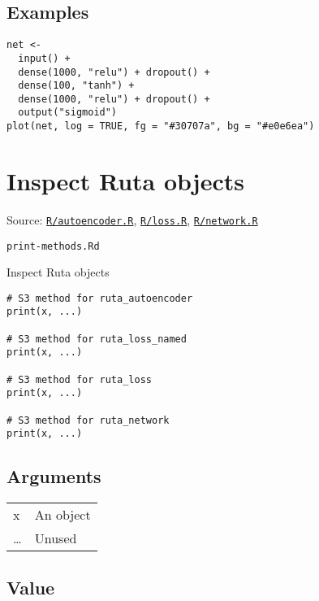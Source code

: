 \hypertarget{examples}{\subsection{\texorpdfstring{\protect\hyperlink{examples}{}Examples}{Examples}}\label{examples}}

\begin{verbatim}
net <-
  input() +
  dense(1000, "relu") + dropout() +
  dense(100, "tanh") +
  dense(1000, "relu") + dropout() +
  output("sigmoid")
plot(net, log = TRUE, fg = "#30707a", bg = "#e0e6ea")
\end{verbatim}

\section{Inspect Ruta objects}\label{inspect-ruta-objects}

Source:
\href{https://github.com/fdavidcl/ruta/blob/master/R/autoencoder.R}{\texttt{R/autoencoder.R}},
\href{https://github.com/fdavidcl/ruta/blob/master/R/loss.R}{\texttt{R/loss.R}},
\href{https://github.com/fdavidcl/ruta/blob/master/R/network.R}{\texttt{R/network.R}}

\texttt{print-methods.Rd}

Inspect Ruta objects

\begin{verbatim}
# S3 method for ruta_autoencoder
print(x, ...)

# S3 method for ruta_loss_named
print(x, ...)

# S3 method for ruta_loss
print(x, ...)

# S3 method for ruta_network
print(x, ...)
\end{verbatim}

\hypertarget{arguments}{\subsection{\texorpdfstring{\protect\hyperlink{arguments}{}Arguments}{Arguments}}\label{arguments}}

\begin{longtable}[c]{@{}ll@{}}
\toprule
x & An object\tabularnewline
\ldots{} & Unused\tabularnewline
\bottomrule
\end{longtable}

\hypertarget{value}{\subsection{\texorpdfstring{\protect\hyperlink{value}{}Value}{Value}}\label{value}}

